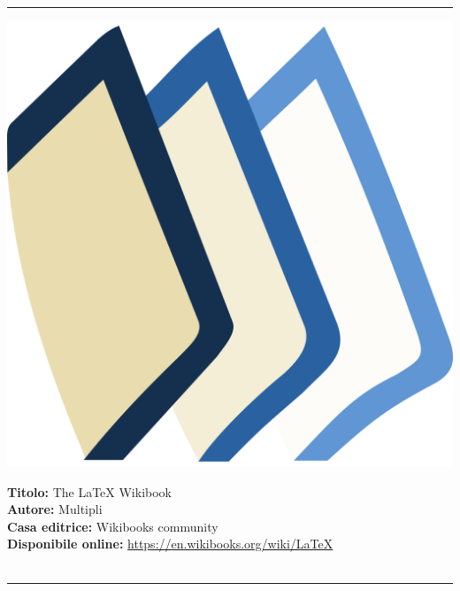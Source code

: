 \documentclass[11pt, a4paper]{article}
\begin{document}
\vspace{.18cm}
\hrule
\vspace{.4cm}
\begin{minipage}[t]{0.17\linewidth}          
	\includegraphics[trim={0 0 0 1cm},clip, width=.95\linewidth,]{Sillabo/images/1200px-Wikibooks-logo.png}
\end{minipage}\hfill
\begin{minipage}[b]{0.75\linewidth}  
    \vspace{.5cm}
	\noindent \textbf{Titolo:} The LaTeX Wikibook  \\
	\textbf{Autore:} Multipli \\
	\textbf{Casa editrice:} Wikibooks community  \\
	\textbf{Disponibile online:} \url{https://en.wikibooks.org/wiki/LaTeX}\\
	\vspace{1cm}
	~
\end{minipage}
\vspace{.18cm}
\hrule

\\

\vspace{.4cm}
\end{document}
